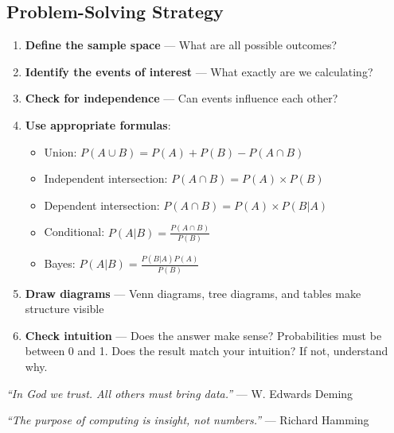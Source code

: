 \documentclass[11pt,a4paper]{article}
\begin{document}
\subsection*{Problem-Solving Strategy}

\begin{enumerate}
    \item \textbf{Define the sample space} — What are all possible outcomes?
    
    \item \textbf{Identify the events of interest} — What exactly are we calculating?
    
    \item \textbf{Check for independence} — Can events influence each other?
    
    \item \textbf{Use appropriate formulas}:
    \begin{itemize}
        \item Union: $P(A \cup B) = P(A) + P(B) - P(A \cap B)$
        \item Independent intersection: $P(A \cap B) = P(A) \times P(B)$
        \item Dependent intersection: $P(A \cap B) = P(A) \times P(B|A)$
        \item Conditional: $P(A|B) = \frac{P(A \cap B)}{P(B)}$
        \item Bayes: $P(A|B) = \frac{P(B|A) P(A)}{P(B)}$
    \end{itemize}
    
    \item \textbf{Draw diagrams} — Venn diagrams, tree diagrams, and tables make structure visible
    
    \item \textbf{Check intuition} — Does the answer make sense? Probabilities must be between 0 and 1. Does the result match your intuition? If not, understand why.
\end{enumerate}

\vspace{0.5cm}

\begin{center}
\textit{``In God we trust. All others must bring data.''} — W. Edwards Deming

\vspace{0.3cm}

\textit{``The purpose of computing is insight, not numbers.''} — Richard Hamming
\end{center}
\end{document}
